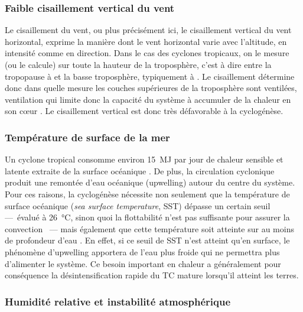\documentclass[../main.tex]{subfiles}
\begin{document}
\subsubsection{Faible cisaillement vertical du vent}

Le cisaillement du vent, ou plus précisément ici, le cisaillement vertical du vent horizontal, exprime la manière dont le vent horizontal varie avec l'altitude,
en intensité comme en direction. Dans le cas des cyclones tropicaux, on le mesure (ou le calcule) sur toute la hauteur de la troposphère, c'est à dire entre la
tropopause à  et la basse troposphère, typiquement à . Le cisaillement détermine donc dans quelle mesure les couches supérieures de la
troposphère sont ventilées, ventilation qui limite donc la capacité du système à accumuler de la chaleur en son cœur \parencite{gray_tropical_1975}. Le
cisaillement vertical est donc très défavorable à la cyclogénèse.

\subsubsection{Température de surface de la mer}

Un cyclone tropical consomme environ \SI{15}{\mega\joule} par jour de chaleur sensible et latente extraite de la surface océanique
\parencite{gray_tropical_1975}. De plus, la circulation cyclonique produit une remontée d'eau océanique (upwelling) autour du centre du système. Pour ces
raisons, la cyclogénèse nécessite non seulement que la température de surface océanique (\textit{sea surface temperature}, SST) dépasse un certain seuil
---~évalué à \SI{26}{\degreeCelsius}, sinon quoi la flottabilité n'est pas suffisante pour assurer la convection \parencite{palmen_formation_1948}~--- mais
également que cette température soit atteinte sur au moins  de profondeur d'eau \parencite{leipper_observed_1967,perlboth_hurricane_1967}. En effet, si ce
seuil de SST n'est atteint qu'en surface, le phénomène d'upwelling apportera de l'eau plus froide qui ne permettra plus d'alimenter le système. Ce besoin
important en chaleur a généralement pour conséquence la désintensification rapide du TC mature lorsqu'il atteint les terres.

\subsubsection{Humidité relative et instabilité atmosphérique}
\end{document}
